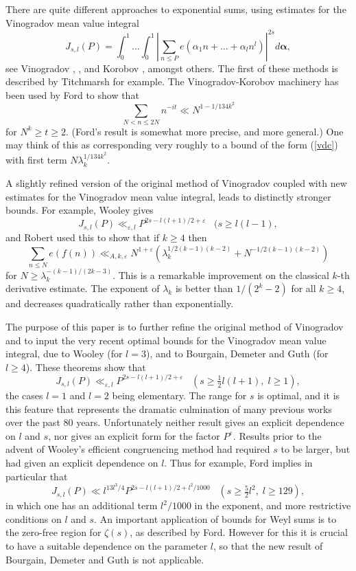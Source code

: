 \documentclass[a4paper,10pt]{article}
\newcommand{\ep}{\varepsilon}
\newcommand{\lk}{\lambda_k}
\newcommand{\bal}{\boldsymbol{\alpha}}
\newcommand{\beql}[1]{\begin{equation}\label{#1}}
\newcommand{\eeq}{\end{equation}}
\begin{document}
There are quite different approaches to exponential sums, using
estimates for the Vinogradov mean value integral
\beql{Jd}
J_{s,l}(P)=\int_0^1\ldots\int_0^1\left|\sum_{n\le P}e(\alpha_1
  n+\ldots +\alpha_l n^l)\right|^{2s}d\bal,
\eeq
see Vinogradov \cite{VB}, \cite{Vk}, and Korobov \cite{Kv}, amongst others.
The first of these methods is described by Titchmarsh \cite[Chapter 6]{Titch}
for example. The Vinogradov-Korobov machinery has been used by Ford
\cite[Theorem 2]{ford} to show that
\beql{f1}
\sum_{N<n\le 2N}n^{-it}\ll N^{1-1/134k^2}
\eeq
for $N^k\ge t\ge 2$.  (Ford's result is somewhat more precise, and
more general.)  One may think of this as corresponding very roughly to
a bound of the form (\ref{vdc}) with first term
$N\lambda_k^{1/134k^2}$.

A slightly refined version of
the original method of Vinogradov \cite{VB} coupled with 
new estimates for
the Vinogradov mean value integral,
leads to distinctly stronger
bounds.  For example, Wooley \cite[Theorem 1.2]{W3} gives
\[J_{s,l}(P)\ll_{\ep,l} P^{2s-l(l+1)/2+\ep}\;\;\;(s\ge l(l-1),\]
and Robert \cite[Theorem 10]{Rob} used this to show that if $k\ge 4$ then
\[\sum_{n\le N}e(f(n))\ll_{A,k,\ep} 
N^{1+\ep}(\lk^{1/2(k-1)(k-2)}+N^{-1/2(k-1)(k-2)})\]
for $N\ge\lk^{-(k-1)/(2k-3)}$.  This is a remarkable improvement on the
  classical $k$-th derivative estimate.  The exponent of $\lk$ is
  better than $1/(2^k-2)$ for all $k\ge 4$, and decreases
  quadratically rather than exponentially.

The purpose of this paper is to further refine
the original method of Vinogradov \cite{VB} and to input the very
recent optimal bounds for
the Vinogradov mean value integral, due to Wooley \cite{W3} (for $l=3$), and to
Bourgain, Demeter and Guth \cite{BDG} (for $l\ge 4$). These theorems
show that
\beql{bdg}
J_{s,l}(P)\ll_{\ep,l} P^{2s-l(l+1)/2+\ep}\;\;\;(s\ge\tfrac12 l(l+1),\;
l\ge 1),
\eeq
the cases $l=1$ and $l=2$ being elementary. The range for $s$ is
optimal, and it 
is this feature that represents the dramatic culmination of many
previous works over the past 80 years. Unfortunately neither result
gives an explicit dependence on $l$ and $s$, nor gives an explicit form
for the factor $P^{\ep}$. Results prior to the advent of Wooley's
efficient congruencing method had required $s$ to be
larger, but had given an explicit dependence on $l$.  Thus for
example, Ford
\cite[Theorem 3]{ford} implies in particular that
\[J_{s,l}(P)\ll l^{13l^3/4} P^{2s-l(l+1)/2+l^2/1000}\;\;\;
(s\ge\tfrac52 l^2,\; l\ge 129),\]
in which one has an additional term $l^2/1000$ in the exponent, and
more restrictive conditions on $l$ and $s$. An important application
of bounds for Weyl sums is to the zero-free region for $\zeta(s)$, as
described by Ford.  However for this it is crucial to have a suitable
dependence on the parameter $l$, so that the new result of Bourgain, 
Demeter and Guth is not applicable.
\end{document}
